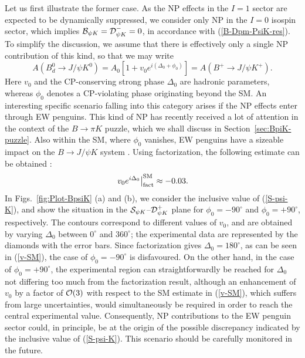 \documentclass[11pt]{cernrep}
\begin{document}
Let us first illustrate 
the former case. As the NP effects in the $I=1$ sector are expected to be 
dynamically suppressed, we consider only NP in the $I=0$ isospin sector,
which implies ${\cal B}_{\psi K} ={\cal D}^-_{\psi K}=0$, in accordance with
(\ref{B-Dpm-PsiK-res}). To simplify the discussion, we assume that there is 
effectively only a single NP contribution of this kind, so that we may write
\begin{equation}\label{ApsiK-NP}
A(B^0_d\to J/\psi K^0)=A_0\left[1+v_0e^{i(\Delta_0+\phi_0)}\right]=A(B^+\to J/\psi K^+).
\end{equation}
Here $v_0$ and the CP-conserving strong phase $\Delta_0$ are hadronic parameters,
whereas $\phi_0$ denotes a CP-violating phase originating beyond the SM. 
An interesting specific scenario falling into this category arises if the NP effects
enter through EW penguins. This kind of NP has recently received a lot of attention 
in the context of the $B\to\pi K$ puzzle, which we shall discuss in 
Section~\ref{sec:BpiK-puzzle}. Also within the SM, where $\phi_0$ vanishes, 
EW penguins have a sizeable impact on the $B\to J/\psi K$ system \cite{RF-EWP-rev}.
Using factorization, the following estimate can be obtained \cite{BFRS3}:
\begin{equation}\label{v-SM}
\left. v_0e^{i\Delta_0}\right|_{\rm fact}^{\rm SM}\approx -0.03.
\end{equation}
In Figs.~\ref{fig:Plot-BpsiK} (a) and (b), we consider the inclusive value of
(\ref{S-psi-K}), and show the situation in the
${\cal S}_{\psi K}$--${\cal D}^+_{\psi K}$ plane for $\phi_0=-90^\circ$
and $\phi_0=+90^\circ$, respectively. The contours correspond to 
different values of $v_0$, and are obtained by varying $\Delta_0$ between 
$0^\circ$ and $360^\circ$; the experimental data are represented by the diamonds
with the error bars. Since factorization gives $\Delta_0=180^\circ$, as can be
seen in (\ref{v-SM}), the case of $\phi_0=-90^\circ$ is disfavoured. On the
other hand, in the case of $\phi_0=+90^\circ$, the experimental region can straightforwardly be reached for $\Delta_0$ not differing too much from the
factorization result, although an enhancement of $v_0$ by a factor of 
${\cal O}(3)$ with respect to the SM estimate in (\ref{v-SM}), which suffers from 
large uncertainties, would simultaneously be required in order to reach the central 
experimental value. Consequently, NP contributions to the EW penguin sector 
could, in principle, be at the origin of the possible discrepancy indicated by the
inclusive value of (\ref{S-psi-K}). This scenario should be carefully monitored in
the future.
\end{document}
